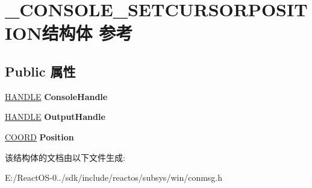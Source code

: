 \hypertarget{struct___c_o_n_s_o_l_e___s_e_t_c_u_r_s_o_r_p_o_s_i_t_i_o_n}{}\section{\+\_\+\+C\+O\+N\+S\+O\+L\+E\+\_\+\+S\+E\+T\+C\+U\+R\+S\+O\+R\+P\+O\+S\+I\+T\+I\+O\+N结构体 参考}
\label{struct___c_o_n_s_o_l_e___s_e_t_c_u_r_s_o_r_p_o_s_i_t_i_o_n}
\subsection*{Public 属性}
\begin{DoxyCompactItemize}
\item 
\mbox{\label{struct___c_o_n_s_o_l_e___s_e_t_c_u_r_s_o_r_p_o_s_i_t_i_o_n_a9a679f2d9b6d0201c13b74d1f4a48000}} 
\hyperlink{interfacevoid}{H\+A\+N\+D\+LE} {\bfseries Console\+Handle}
\item 
\mbox{\label{struct___c_o_n_s_o_l_e___s_e_t_c_u_r_s_o_r_p_o_s_i_t_i_o_n_a7fe8d03193daab96dc2dc47eda130693}} 
\hyperlink{interfacevoid}{H\+A\+N\+D\+LE} {\bfseries Output\+Handle}
\item 
\mbox{\label{struct___c_o_n_s_o_l_e___s_e_t_c_u_r_s_o_r_p_o_s_i_t_i_o_n_a0ccb2a4c24e832837bf548b0d7383914}} 
\hyperlink{struct___c_o_o_r_d}{C\+O\+O\+RD} {\bfseries Position}
\end{DoxyCompactItemize}


该结构体的文档由以下文件生成\+:\begin{DoxyCompactItemize}
\item 
E\+:/\+React\+O\+S-\/0../sdk/include/reactos/subsys/win/conmsg.\+h\end{DoxyCompactItemize}
